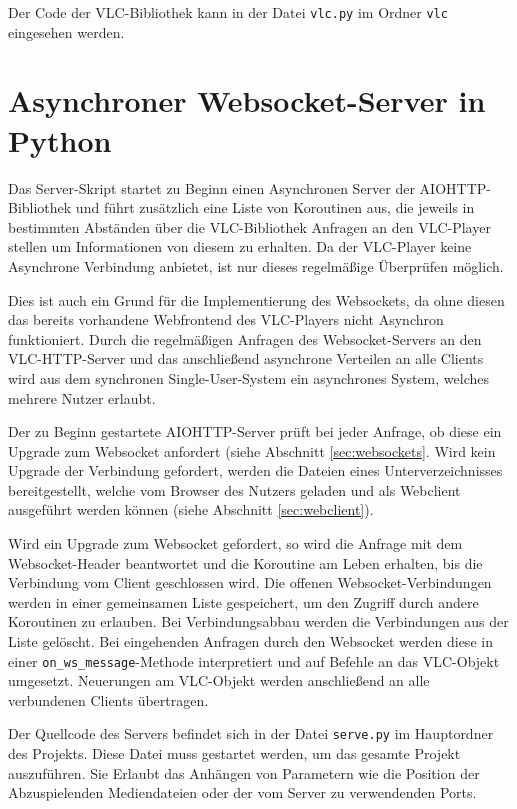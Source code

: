 \documentclass[12pt,a4paper,hidelinks]{scrreprt}
\begin{document}
	Der Code der VLC-Bibliothek kann in der Datei \texttt{vlc.py} im Ordner \texttt{vlc} eingesehen werden.
	
\section{Asynchroner Websocket-Server in Python}
	Das Server-Skript startet zu Beginn einen Asynchronen Server der AIOHTTP-Bibliothek und führt zusätzlich eine Liste von Koroutinen aus, die jeweils in bestimmten Abständen über die VLC-Bibliothek Anfragen an den VLC-Player stellen um Informationen von diesem zu erhalten. Da der VLC-Player keine Asynchrone Verbindung anbietet, ist nur dieses regelmäßige Überprüfen möglich. 
	
	Dies ist auch ein Grund für die Implementierung des Websockets, da ohne diesen das bereits vorhandene Webfrontend des VLC-Players nicht Asynchron funktioniert. Durch die regelmäßigen Anfragen des Websocket-Servers an den VLC-HTTP-Server und das anschließend asynchrone Verteilen an alle Clients wird aus dem synchronen Single-User-System ein asynchrones System, welches mehrere Nutzer erlaubt.
	
	Der zu Beginn gestartete AIOHTTP-Server prüft bei jeder Anfrage, ob diese ein Upgrade zum Websocket anfordert (siehe Abschnitt \ref{sec:websockets}. 
	Wird kein Upgrade der Verbindung gefordert, werden die Dateien eines Unterverzeichnisses bereitgestellt, welche vom Browser des Nutzers geladen und als Webclient ausgeführt werden können (siehe Abschnitt \ref{sec:webclient}). 
	
	Wird ein Upgrade zum Websocket gefordert, so wird die Anfrage mit dem Websocket-Header beantwortet und die Koroutine am Leben erhalten, bis die Verbindung vom Client geschlossen wird. Die offenen Websocket-Verbindungen werden in einer gemeinsamen Liste gespeichert, um den Zugriff durch andere Koroutinen zu erlauben. Bei Verbindungsabbau werden die Verbindungen aus der Liste gelöscht.
	Bei eingehenden Anfragen durch den Websocket werden diese in einer \texttt{on_ws_message}-Methode interpretiert und auf Befehle an das VLC-Objekt umgesetzt. Neuerungen am VLC-Objekt werden anschließend an alle verbundenen Clients übertragen.

	Der Quellcode des Servers befindet sich in der Datei \texttt{serve.py} im Hauptordner des Projekts. Diese Datei muss gestartet werden, um das gesamte Projekt auszuführen. Sie Erlaubt das Anhängen von Parametern wie die Position der Abzuspielenden Mediendateien oder der vom Server zu verwendenden Ports.
\end{document}
